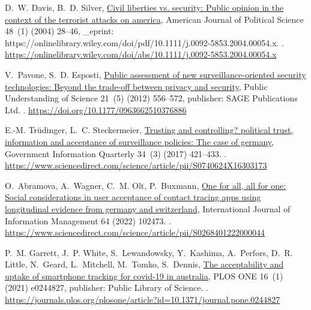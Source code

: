 \documentclass[
  number]{elsarticle}
\begin{document}
\begin{thebibliography}{10}
D.~W. Davis, B.~D. Silver, \href{https://onlinelibrary.wiley.com/doi/abs/10.1111/j.0092-5853.2004.00054.x}{Civil liberties vs. security: Public opinion in the context of the terrorist attacks on america}, American Journal of Political Science 48~(1) (2004) 28--46, {\_}eprint: https://onlinelibrary.wiley.com/doi/pdf/10.1111/j.0092-5853.2004.00054.x.
\newblock \href {https://doi.org/10.1111/j.0092-5853.2004.00054.x} {}.
\newline\urlprefix\url{https://onlinelibrary.wiley.com/doi/abs/10.1111/j.0092-5853.2004.00054.x}

V.~Pavone, S.~D. Esposti, \href{https://doi.org/10.1177/0963662510376886}{Public assessment of new surveillance-oriented security technologies: Beyond the trade-off between privacy and security}, Public Understanding of Science 21~(5) (2012) 556--572, publisher: SAGE Publications Ltd.
\newblock \href {https://doi.org/10.1177/0963662510376886} {}.
\newline\urlprefix\url{https://doi.org/10.1177/0963662510376886}

E.-M. {Trüdinger}, L.~C. Steckermeier, \href{https://www.sciencedirect.com/science/article/pii/S0740624X16303173}{Trusting and controlling? political trust, information and acceptance of surveillance policies: The case of germany}, Government Information Quarterly 34~(3) (2017) 421--433.
\newblock \href {https://doi.org/10.1016/j.giq.2017.07.003} {}.
\newline\urlprefix\url{https://www.sciencedirect.com/science/article/pii/S0740624X16303173}

O.~Abramova, A.~Wagner, C.~M. Olt, P.~Buxmann, \href{https://www.sciencedirect.com/science/article/pii/S0268401222000044}{One for all, all for one: Social considerations in user acceptance of contact tracing apps using longitudinal evidence from germany and switzerland}, International Journal of Information Management 64 (2022) 102473.
\newblock \href {https://doi.org/10.1016/j.ijinfomgt.2022.102473} {}.
\newline\urlprefix\url{https://www.sciencedirect.com/science/article/pii/S0268401222000044}

P.~M. Garrett, J.~P. White, S.~Lewandowsky, Y.~Kashima, A.~Perfors, D.~R. Little, N.~Geard, L.~Mitchell, M.~Tomko, S.~Dennis, \href{https://journals.plos.org/plosone/article?id=10.1371/journal.pone.0244827}{The acceptability and uptake of smartphone tracking for covid-19 in australia}, PLOS ONE 16~(1) (2021) e0244827, publisher: Public Library of Science.
\newblock \href {https://doi.org/10.1371/journal.pone.0244827} {}.
\newline\urlprefix\url{https://journals.plos.org/plosone/article?id=10.1371/journal.pone.0244827}


\end{thebibliography}
\end{document}
